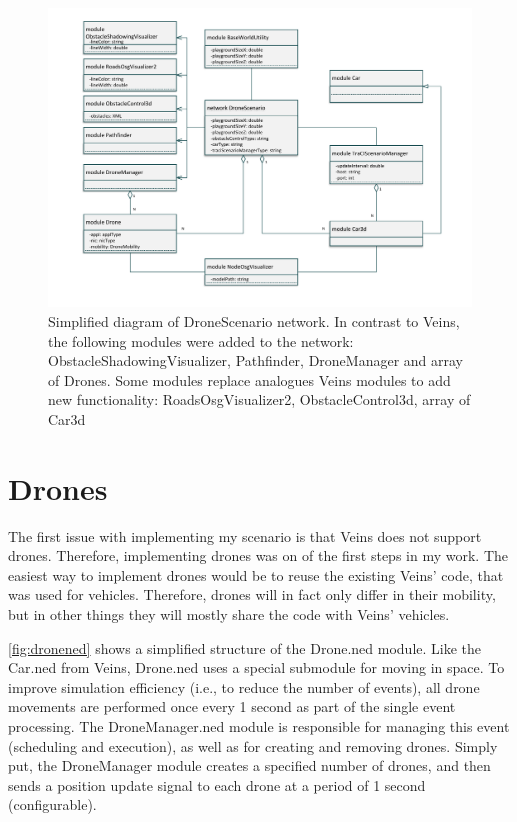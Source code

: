 \documentclass[]{nsm-thesis}
\begin{document}
\begin{figure}
	\centering
	\includegraphics[width=1\textwidth]{figures/DroneScenario.pdf}
	\caption{Simplified diagram of DroneScenario network. In contrast to Veins, the following modules were added to the network: ObstacleShadowingVisualizer, Pathfinder, DroneManager and array of Drones. Some modules replace analogues Veins modules to add new functionality: RoadsOsgVisualizer2, ObstacleControl3d, array of Car3d}
	\label{fig:dronescenarioned}
\end{figure}



\section{Drones}

The first issue with implementing my scenario is that Veins does not support drones. Therefore, implementing drones was on of the first steps in my work. The easiest way to implement drones would be to reuse the existing Veins' code, that was used for vehicles. Therefore, drones will in fact only differ in their mobility, but in other things they will mostly share the code with Veins' vehicles.

\cref{fig:dronened} shows a simplified structure of the Drone.ned module. Like the Car.ned from Veins, Drone.ned uses a special submodule for moving in space. To improve simulation efficiency (i.e., to reduce the number of events), all drone movements are performed once every 1 second as part of the single event processing. The DroneManager.ned module is responsible for managing this event (scheduling and execution), as well as for creating and removing drones. Simply put, the DroneManager module creates a specified number of drones, and then sends a position update signal to each drone at a period of 1 second (configurable). 
\end{document}
